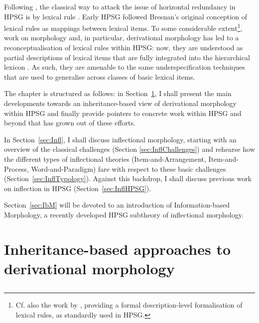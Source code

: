 \documentclass[output=paper
                ,modfonts
                ,nonflat
	        ,collection
	        ,collectionchapter
	        ,collectiontoclongg
 	        ,biblatex
                ,babelshorthands
                ,newtxmath
                ,draftmode
                ,colorlinks, citecolor=brown
] {langscibook}
\begin{document}
{Following \citet{Bresnan82}, the classical way to attack the issue of
horizontal redundancy in HPSG is by lexical rule
\citep{Flickinger87}. Early HPSG followed Bresnan's original
conception of lexical rules as mappings between lexical items. To some
considerable extent\footnote{Cf. also the work by
  \citet{meurers:towards,Meurers02}, providing a formal
  description-level formalisation of lexical rules, as standardly used
  in HPSG.}, work on morphology and, in particular, derivational
morphology has led to a reconceptualisation of lexical rules within
HPSG: now, they are understood as partial descriptions of lexical
items that are fully integrated into the hierarchical lexicon
\citep{meurers:towards,Copestake:01,Koenig99}. As such, they are
amenable to the same underspecification techniques that are used to
generalise across classes of basic lexical items.


\bigskip\noindent
The chapter is structured as follows: in Section~\ref{sec:Deriv}, I
shall present the main developments towards an inheritance-based view
of derivational morphology within HPSG and finally provide pointers to
concrete work within HPSG and beyond that has grown out of
these efforts. 

In Section~\ref{sec:Infl}, I shall discuss inflectional morphology,
starting with an overview of the classical challenges
(Section \ref{sec:InflChallenges}) and rehearse how the different types of
inflectional theories (Item-and-Arrangement, Item-and-Process,
Word-and-Paradigm) fare with respect to these basic
challenges (Section~\ref{sec:InflTypology}). Against this
backdrop, I shall  discuss previous work on inflection in HPSG (Section~\ref{sec:InflHPSG}).  

Section~\ref{sec:IbM} will be devoted to an introduction of
Information-based Morphology, a recently developed HPSG subtheory of
inflectional morphology.



\section{Inheritance-based approaches to derivational morphology}
\label{sec:Deriv}

\subsection{\citet{Krieger:Nerbonne:93}}

}
\end{document}

